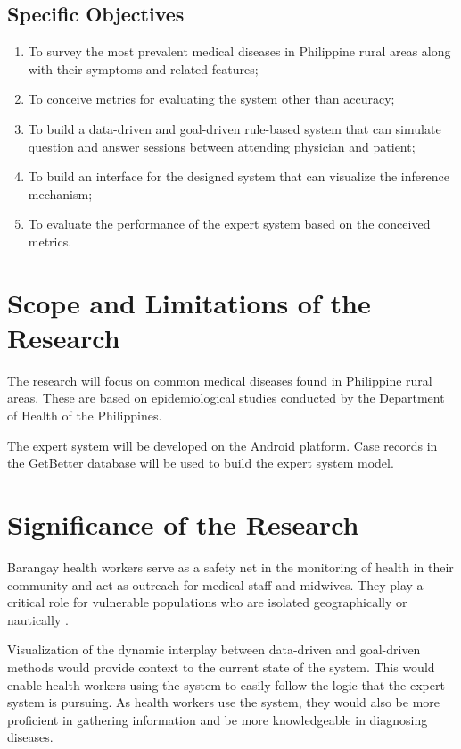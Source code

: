 \subsection{Specific Objectives}
\label{sec:specificobjectives}

\begin{enumerate}
    \item To survey the most prevalent medical diseases in Philippine rural areas along with their symptoms and related features;
    \item To conceive metrics for evaluating the system other than accuracy;
    \item To build a data-driven and goal-driven rule-based system that can simulate question and answer sessions between attending physician and patient;
    \item To build an interface for the designed system that can visualize the inference mechanism; %
    \item To evaluate the performance of the expert system based on the conceived metrics.
\end{enumerate}


\section{Scope and Limitations of the Research}
\label{sec:scopelimitations}

The research will focus on common medical diseases found in Philippine rural areas. 
These are based on epidemiological studies conducted by the Department of Health of the Philippines.

The expert system will be developed on the Android platform. 
Case records in the GetBetter database will be used to build the expert system model. 

\section{Significance of the Research}
\label{sec:significance}

Barangay health workers serve as a safety net in the monitoring of health in their community and act as outreach for medical staff and midwives.
They play a critical role for vulnerable populations who are isolated geographically or nautically \cite{DirectRelief:2014}.

Visualization of the dynamic interplay between data-driven and goal-driven methods would provide context to the current state of the system.
This would enable health workers using the system to easily follow the logic that the expert system is pursuing. 
As health workers use the system, they would also be more proficient in gathering information and be more knowledgeable in diagnosing diseases.
